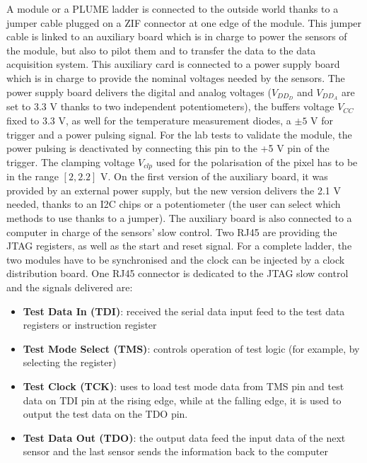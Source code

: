   A module or a PLUME ladder is connected to the outside world thanks to a jumper cable plugged on a ZIF connector at one edge of the module.
  This jumper cable is linked to an auxiliary board which is in charge to power the sensors of the module, but also to pilot them and to transfer the data to the data acquisition system.
  This auxiliary card is connected to a power supply board which is in charge to provide the nominal voltages needed by the sensors.
  The power supply board delivers the digital and analog voltages ($V_{DD_D}$ and $V_{DD_A}$ are set to 3.3 V thanks to two independent potentiometers), the buffers voltage $V_{CC}$ fixed to 3.3 V, as well for the temperature measurement diodes, a $\pm 5$ V for trigger and a power pulsing signal.
  For the lab tests to validate the module, the power pulsing is deactivated by connecting this pin to the +5 V pin of the trigger.
  The clamping voltage $V_{clp}$ used for the polarisation of the pixel has to be in the range $\left[2, 2.2\right]$ V.
  On the first version of the auxiliary board, it was provided by an external power supply, but the new version delivers the 2.1 V needed, thanks to an I2C chips or a potentiometer (the user can select which methods to use thanks to a jumper).
  The auxiliary board is also connected to a computer in charge of the sensors' slow control.
  Two RJ45 are providing the JTAG registers, as well as the start and reset signal. 
  For a complete ladder, the two modules have to be synchronised and the clock can be injected by a clock distribution board.
  One RJ45 connector is dedicated to the JTAG slow control and the signals delivered are: 

  \begin{itemize}
    \item \textbf{Test Data In (TDI)}: received the serial data input feed to the test data registers or instruction register
    \item \textbf{Test Mode Select (TMS)}: controls operation of test logic (for example, by selecting the register)
    \item \textbf{Test Clock (TCK)}: uses to load test mode data from TMS pin and test data on TDI pin at the rising edge, while at the falling edge, it is used to output the test data on the TDO pin.
    \item \textbf{Test Data Out (TDO)}: the output data feed the input data of the next sensor and the last sensor sends the information back to the computer 
  \end{itemize}

